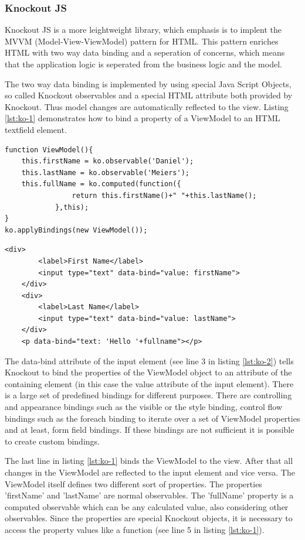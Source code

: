 \subsubsection{Knockout JS}

Knockout JS is a more leightweight library, which emphasis is to implent the MVVM (Model-View-ViewModel) pattern for HTML.
This pattern enriches HTML with two way data binding and a seperation of concerns, which means that the application logic is seperated from the business logic and the model.

The two way data binding is implemented by using special Java Script Objects, so called Knockout observables and a special HTML attribute both provided by Knockout.
Thus model changes are automatically reflected to the view.
Listing \ref{lst:ko-1} demonstrates how to bind a property of a ViewModel to an HTML textfield element.

\begin{lstlisting}[label=lst:ko-1,caption=the ViewModel]
function ViewModel(){
	this.firstName = ko.observable('Daniel');
	this.lastName = ko.observable('Meiers');
	this.fullName = ko.computed(function({
				return this.firstName()+" "+this.lastName();
			},this); 
}
ko.applyBindings(new ViewModel());
\end{lstlisting}

\begin{lstlisting}[label=lst:ko-2,caption=the html view]
 	<div>
		<label>First Name</label> 
		<input type="text" data-bind="value: firstName">
	</div>
	<div>
		<label>Last Name</label> 
		<input type="text" data-bind="value: lastName">
	</div>
	<p data-bind="text: 'Hello '+fullname"></p>
\end{lstlisting}

The data-bind attribute of the input element (see line 3 in listing \ref{lst:ko-2}) tells Knockout to bind the properties of the ViewModel object to an attribute of the containing element (in this case the value attribute of the input element).
There is a large set of predefined bindings for different purposes.
There are controlling and appearance bindings such as the visible or the style binding, control flow bindings such as the foreach binding to iterate over a set of ViewModel properties and at least, form field bindings.
If these bindings are not sufficient it is possible to create custom bindings.


The last line in listing \ref{lst:ko-1} binds the ViewModel to the view.
After that all changes in the ViewModel are reflected to the input element and vice versa.
The ViewModel itself defines two different sort of properties.
The properties 'firstName' and 'lastName' are normal observables.
The 'fullName' property is a computed observable which can be any calculated value, also considering other observables.
Since the properties are special Knockout objects, it is necessary to access the property values like a function (see line 5 in listing \ref{lst:ko-1}).

